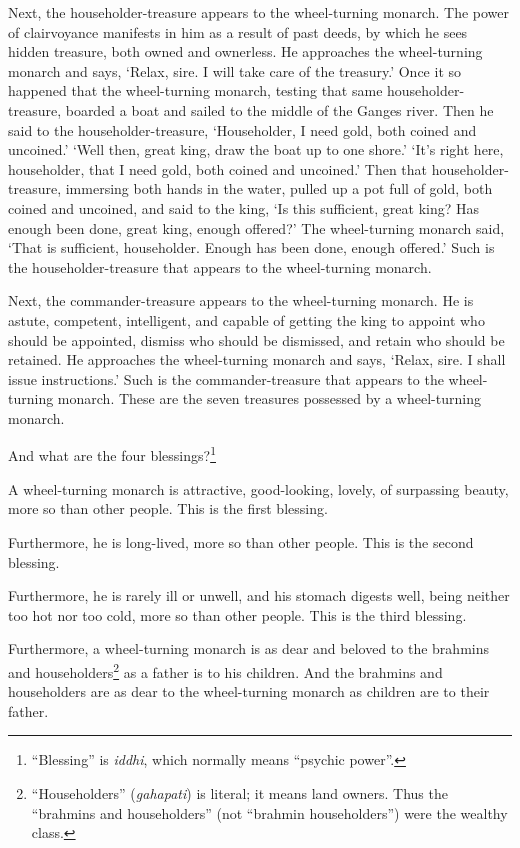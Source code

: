 \documentclass[12pt,openany]{book}%
\begin{document}
Next, the householder-treasure appears to the wheel-turning monarch. The power of clairvoyance manifests in him as a result of past deeds, by which he sees hidden treasure, both owned and ownerless. He approaches the wheel-turning monarch and says, ‘Relax, sire. I will take care of the treasury.’ Once it so happened that the wheel-turning monarch, testing that same householder-treasure, boarded a boat and sailed to the middle of the Ganges river. Then he said to the householder-treasure, ‘Householder, I need gold, both coined and uncoined.’ ‘Well then, great king, draw the boat up to one shore.’ ‘It’s right here, householder, that I need gold, both coined and uncoined.’ Then that householder-treasure, immersing both hands in the water, pulled up a pot full of gold, both coined and uncoined, and said to the king, ‘Is this sufficient, great king? Has enough been done, great king, enough offered?’ The wheel-turning monarch said, ‘That is sufficient, householder. Enough has been done, enough offered.’ Such is the householder-treasure that appears to the wheel-turning monarch. 

Next, the commander-treasure appears to the wheel-turning monarch. He is astute, competent, intelligent, and capable of getting the king to appoint who should be appointed, dismiss who should be dismissed, and retain who should be retained. He approaches the wheel-turning monarch and says, ‘Relax, sire. I shall issue instructions.’ Such is the commander-treasure that appears to the wheel-turning monarch. These are the seven treasures possessed by a wheel-turning monarch. 

And what are the four blessings?\footnote{“Blessing” is \textit{iddhi}, which normally means “psychic power”. } 

A wheel-turning monarch is attractive, good-looking, lovely, of surpassing beauty, more so than other people. This is the first blessing. 

Furthermore, he is long-lived, more so than other people. This is the second blessing. 

Furthermore, he is rarely ill or unwell, and his stomach digests well, being neither too hot nor too cold, more so than other people. This is the third blessing. 

Furthermore, a wheel-turning monarch is as dear and beloved to the brahmins and householders\footnote{“Householders” (\textit{gahapati}) is literal; it means land owners. Thus the “brahmins and householders” (not “brahmin householders”) were the wealthy class. } as a father is to his children. And the brahmins and householders are as dear to the wheel-turning monarch as children are to their father. 
\end{document}
